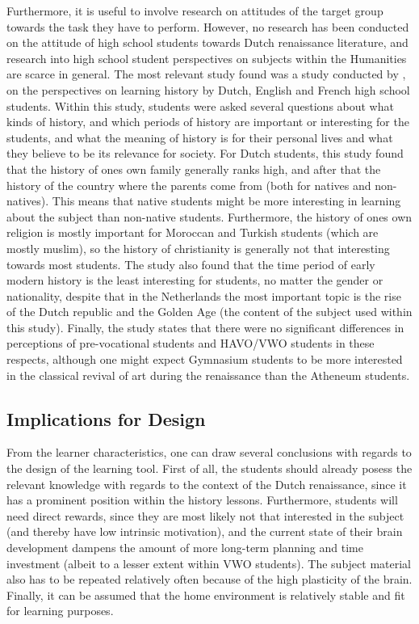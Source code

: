 Furthermore, it is useful to involve research on attitudes of the target group towards the task they have to perform. However, no research has been conducted on the attitude of high school students towards Dutch renaissance literature, and research into high school student perspectives on subjects within the Humanities are scarce in general. The most relevant study found was a study conducted by , on the perspectives on learning history by Dutch, English and French high school students. Within this study, students were asked several questions about what kinds of history, and which periods of history are important or interesting for the students, and what the meaning of history is for their personal lives and what they believe to be its relevance for society. For Dutch students, this study found that the history of ones own family generally ranks high, and after that the history of the country where the parents come from (both for natives and non-natives). This means that native students might be more interesting in learning about the subject than non-native students. Furthermore, the history of ones own religion is mostly important for Moroccan and Turkish students (which are mostly muslim), so the history of christianity is generally not that interesting towards most students. The study also found that the time period of early modern history is the least interesting for students, no matter the gender or nationality, despite that in the Netherlands the most important topic is the rise of the Dutch republic and the Golden Age (the content of the subject used within this study). Finally, the study states that there were no significant differences in perceptions of pre-vocational students and HAVO/VWO students in these respects, although one might expect Gymnasium students to be more interested in the classical revival of art during the renaissance than the Atheneum students.

\subsection{Implications for Design}

From the learner characteristics, one can draw several conclusions with regards to the design of the learning tool. First of all, the students should already posess the relevant knowledge with regards to the context of the Dutch renaissance, since it has a prominent position within the history lessons. Furthermore, students will need direct rewards, since they are most likely not that interested in the subject (and thereby have low intrinsic motivation), and the current state of their brain development dampens the amount of more long-term planning and time investment (albeit to a lesser extent within VWO students). The subject material also has to be repeated relatively often because of the high plasticity of the brain. Finally, it can be assumed that the home environment is relatively stable and fit for learning purposes.

